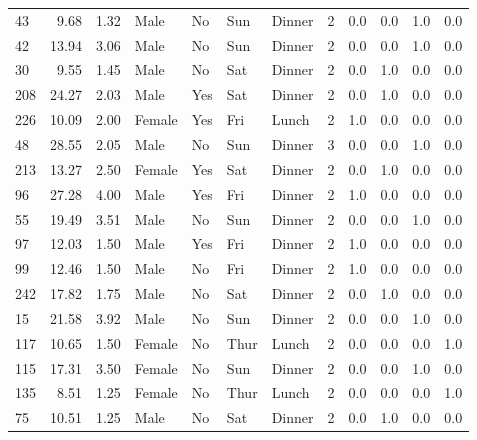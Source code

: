\documentclass[
  letterpaper,
  DIV=11,
  numbers=noendperiod]{scrreprt}
\begin{document}
\begin{tabular}{lrrllllrrrrr}
43  &        9.68 &  1.32 &    Male &     No &   Sun &  Dinner &     2 &      0.0 &      0.0 &      1.0 &       0.0 \\
42  &       13.94 &  3.06 &    Male &     No &   Sun &  Dinner &     2 &      0.0 &      0.0 &      1.0 &       0.0 \\
30  &        9.55 &  1.45 &    Male &     No &   Sat &  Dinner &     2 &      0.0 &      1.0 &      0.0 &       0.0 \\
208 &       24.27 &  2.03 &    Male &    Yes &   Sat &  Dinner &     2 &      0.0 &      1.0 &      0.0 &       0.0 \\
226 &       10.09 &  2.00 &  Female &    Yes &   Fri &   Lunch &     2 &      1.0 &      0.0 &      0.0 &       0.0 \\
48  &       28.55 &  2.05 &    Male &     No &   Sun &  Dinner &     3 &      0.0 &      0.0 &      1.0 &       0.0 \\
213 &       13.27 &  2.50 &  Female &    Yes &   Sat &  Dinner &     2 &      0.0 &      1.0 &      0.0 &       0.0 \\
96  &       27.28 &  4.00 &    Male &    Yes &   Fri &  Dinner &     2 &      1.0 &      0.0 &      0.0 &       0.0 \\
55  &       19.49 &  3.51 &    Male &     No &   Sun &  Dinner &     2 &      0.0 &      0.0 &      1.0 &       0.0 \\
97  &       12.03 &  1.50 &    Male &    Yes &   Fri &  Dinner &     2 &      1.0 &      0.0 &      0.0 &       0.0 \\
99  &       12.46 &  1.50 &    Male &     No &   Fri &  Dinner &     2 &      1.0 &      0.0 &      0.0 &       0.0 \\
242 &       17.82 &  1.75 &    Male &     No &   Sat &  Dinner &     2 &      0.0 &      1.0 &      0.0 &       0.0 \\
15  &       21.58 &  3.92 &    Male &     No &   Sun &  Dinner &     2 &      0.0 &      0.0 &      1.0 &       0.0 \\
117 &       10.65 &  1.50 &  Female &     No &  Thur &   Lunch &     2 &      0.0 &      0.0 &      0.0 &       1.0 \\
115 &       17.31 &  3.50 &  Female &     No &   Sun &  Dinner &     2 &      0.0 &      0.0 &      1.0 &       0.0 \\
135 &        8.51 &  1.25 &  Female &     No &  Thur &   Lunch &     2 &      0.0 &      0.0 &      0.0 &       1.0 \\
75  &       10.51 &  1.25 &    Male &     No &   Sat &  Dinner &     2 &      0.0 &      1.0 &      0.0 &       0.0 \\

\end{tabular}
\end{document}
